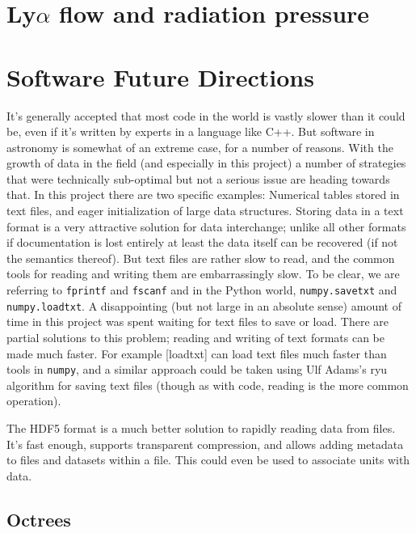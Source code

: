 \section{Ly$\alpha$ flow and radiation pressure}

\section{Software Future Directions}

It's generally accepted that most code in the world is vastly slower than it could be, even if it's written by experts in a language like C++.
But software in astronomy is somewhat of an extreme case, for a number of reasons.
With the growth of data in the field (and especially in this project) a number of strategies that were technically sub-optimal but not a serious issue are heading towards that.
In this project there are two specific examples: Numerical tables stored in text files, and eager initialization of large data structures.
Storing data in a text format is a very attractive solution for data interchange; unlike all other formats if documentation is lost entirely at least the data itself can be recovered (if not the semantics thereof).
But text files are rather slow to read, and the common tools for reading and writing them are embarrassingly slow. To be clear, we are referring to \lstinline{fprintf} and \lstinline{fscanf} and in the Python world, \lstinline{numpy.savetxt} and \lstinline{numpy.loadtxt}.
A disappointing (but not large in an absolute sense) amount of time in this project was spent waiting for text files to save or load.
There are partial solutions to this problem; reading and writing of text formats can be made much faster.
For example \href{https://github.com/saethlin/loadtxt}[loadtxt] can load text files much faster than tools in \lstinline{numpy}, and a similar approach could be taken using Ulf Adams's ryu algorithm for saving text files (though as with code, reading is the more common operation).

The HDF5 format is a much better solution to rapidly reading data from files.
It's fast enough, supports transparent compression, and allows adding metadata to files and datasets within a file.
This could even be used to associate units with data.

\subsection{Octrees}

